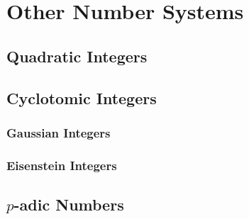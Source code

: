 

\section{Other Number Systems}






\subsection{Quadratic Integers}




\subsection{Cyclotomic Integers}


\subsubsection{Gaussian Integers}



\subsubsection{Eisenstein Integers}




\subsection{$p$-adic Numbers}

